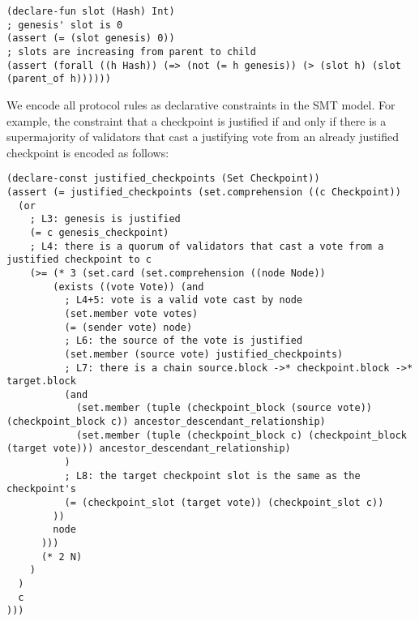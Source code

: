 \begin{lstlisting}[language=smt]
(declare-fun slot (Hash) Int)
; genesis' slot is 0
(assert (= (slot genesis) 0))
; slots are increasing from parent to child
(assert (forall ((h Hash)) (=> (not (= h genesis)) (> (slot h) (slot (parent_of h))))))
\end{lstlisting}

We encode all protocol rules as declarative constraints in the SMT model. For
example, the constraint that a checkpoint is justified if and only if there is
a supermajority of validators that cast a justifying vote from an already
justified checkpoint is encoded as follows:

\begin{lstlisting}[language=smt]
(declare-const justified_checkpoints (Set Checkpoint))
(assert (= justified_checkpoints (set.comprehension ((c Checkpoint))
  (or
    ; L3: genesis is justified
    (= c genesis_checkpoint)
    ; L4: there is a quorum of validators that cast a vote from a justified checkpoint to c
    (>= (* 3 (set.card (set.comprehension ((node Node))
        (exists ((vote Vote)) (and
          ; L4+5: vote is a valid vote cast by node
          (set.member vote votes)
          (= (sender vote) node)
          ; L6: the source of the vote is justified
          (set.member (source vote) justified_checkpoints)
          ; L7: there is a chain source.block ->* checkpoint.block ->* target.block
          (and
            (set.member (tuple (checkpoint_block (source vote)) (checkpoint_block c)) ancestor_descendant_relationship)
            (set.member (tuple (checkpoint_block c) (checkpoint_block (target vote))) ancestor_descendant_relationship)
          )
          ; L8: the target checkpoint slot is the same as the checkpoint's
          (= (checkpoint_slot (target vote)) (checkpoint_slot c))
        ))
        node
      )))
      (* 2 N)
    )
  )
  c
)))
\end{lstlisting}
